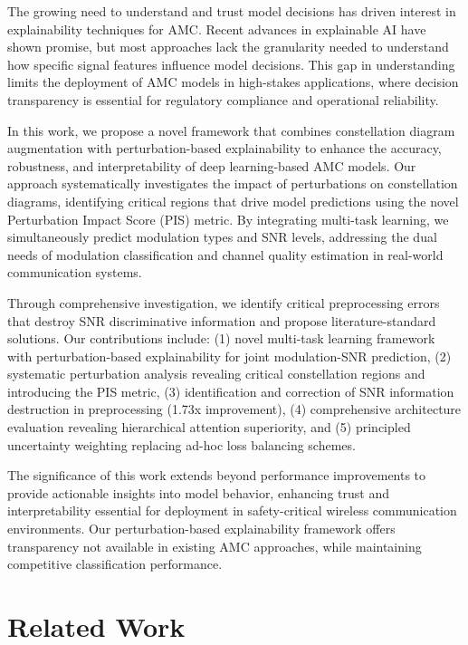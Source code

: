 \documentclass{ELSP}
\begin{document}
The growing need to understand and trust model decisions has driven interest in explainability techniques for AMC. Recent advances in explainable AI have shown promise, but most approaches lack the granularity needed to understand how specific signal features influence model decisions. This gap in understanding limits the deployment of AMC models in high-stakes applications, where decision transparency is essential for regulatory compliance and operational reliability.

In this work, we propose a novel framework that combines constellation diagram augmentation with perturbation-based explainability to enhance the accuracy, robustness, and interpretability of deep learning-based AMC models. Our approach systematically investigates the impact of perturbations on constellation diagrams, identifying critical regions that drive model predictions using the novel Perturbation Impact Score (PIS) metric. By integrating multi-task learning, we simultaneously predict modulation types and SNR levels, addressing the dual needs of modulation classification and channel quality estimation in real-world communication systems.

Through comprehensive investigation, we identify critical preprocessing errors that destroy SNR discriminative information and propose literature-standard solutions. Our contributions include: (1) novel multi-task learning framework with perturbation-based explainability for joint modulation-SNR prediction, (2) systematic perturbation analysis revealing critical constellation regions and introducing the PIS metric, (3) identification and correction of SNR information destruction in preprocessing (1.73x improvement), (4) comprehensive architecture evaluation revealing hierarchical attention superiority, and (5) principled uncertainty weighting replacing ad-hoc loss balancing schemes.

The significance of this work extends beyond performance improvements to provide actionable insights into model behavior, enhancing trust and interpretability essential for deployment in safety-critical wireless communication environments. Our perturbation-based explainability framework offers transparency not available in existing AMC approaches, while maintaining competitive classification performance.

\section{Related Work}
\end{document}
